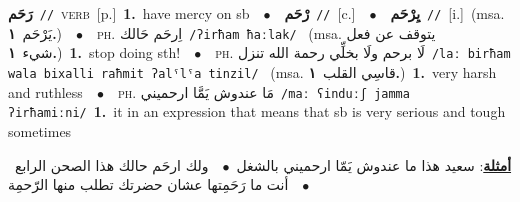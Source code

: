 \documentclass[10pt,a4paper,twoside]{article} %
\begin{document}
\begin{multicols}{2}
{\setlength\topsep{0pt}\textbf{\foreignlanguage{arabic}{رَحَم}}\ {\color{gray}\texttt{//}\color{black}}\ \textsc{verb}\ [p.]\ \textbf{1.}~have mercy on sb\ \ $\bullet$\ \ \setlength\topsep{0pt}\textbf{\foreignlanguage{arabic}{رْحَم}}\ {\color{gray}\texttt{//}\color{black}}\ [c.]\ \ $\bullet$\ \ \setlength\topsep{0pt}\textbf{\foreignlanguage{arabic}{يِرْحَم}}\ {\color{gray}\texttt{//}\color{black}}\ [i.]\ \color{gray}(msa. \foreignlanguage{arabic}{يَرْحَم}~\foreignlanguage{arabic}{\textbf{١.}})\color{black}\ \ $\bullet$\ \ \textsc{ph.} \color{gray} \foreignlanguage{arabic}{اِرحَم حَالك}\color{black}\ {\color{gray}\texttt{/{\sffamily ʔirħam ħaːlak}/}\color{black}}\ \color{gray} (msa. \foreignlanguage{arabic}{يتوقف عن فعل شيء}~\foreignlanguage{arabic}{\textbf{١.}})\color{black}\ \textbf{1.}~stop doing sth!\ \ $\bullet$\ \ \textsc{ph.} \color{gray} \foreignlanguage{arabic}{لَا برحم ولَا بخلِّي رحمة الله تنزل}\color{black}\ {\color{gray}\texttt{/{\sffamily laː birħam wala bixalli raħmit ʔalˤlˤa tinzil}/}\color{black}}\ \color{gray} (msa. \foreignlanguage{arabic}{قاسِي القلب}~\foreignlanguage{arabic}{\textbf{١.}})\color{black}\ \textbf{1.}~very harsh and ruthless\ \ $\bullet$\ \ \textsc{ph.} \color{gray} \foreignlanguage{arabic}{مَا عندوش يَمَّا ارحميني}\color{black}\ {\color{gray}\texttt{/{\sffamily maː ʕinduːʃ jamma ʔirħamiːni}/}\color{black}}\ \textbf{1.}~it in an expression that means that sb is very serious and tough sometimes\  \begin{flushright}\color{gray}\foreignlanguage{arabic}{\textbf{\underline{\foreignlanguage{arabic}{أمثلة}}}: سعيد هذا ما عندوش يَمّا ارحميني بالشغل\ $\bullet$\ \  ولك ارحَم حالك هذا الصحن الرابع\ $\bullet$\ \  أنت ما رَحَمِتها عشان حضرتك تطلب منها الرّحمِة}\end{flushright}\color{black}} \vspace{2mm}


\end{multicols}
\end{document}

